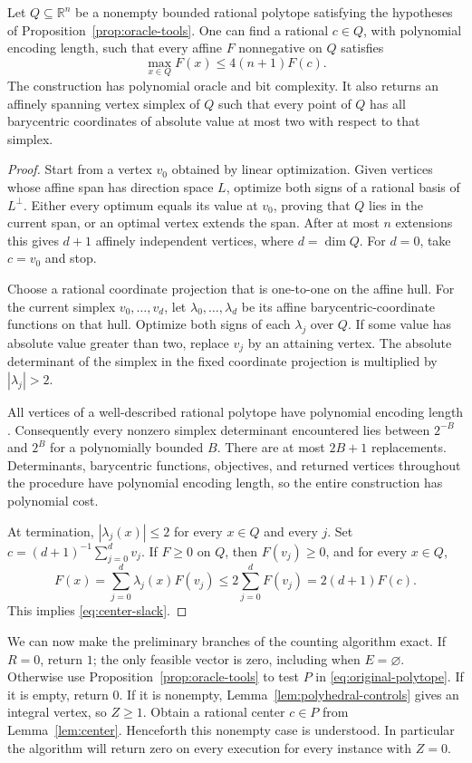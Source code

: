 \begin{lemma}\label{lem:center}
Let $Q\subseteq\mathbb R^n$ be a nonempty bounded rational polytope
satisfying the hypotheses of Proposition~\ref{prop:oracle-tools}.
One can find a rational $c\in Q$, with polynomial encoding length,
such that every affine $F$ nonnegative on $Q$ satisfies
\begin{equation}\label{eq:center-slack}
 \max_{x\in Q}F(x)\leq4(n+1)F(c).
\end{equation}
The construction has polynomial oracle and bit complexity.
It also returns an affinely spanning vertex simplex of $Q$ such that
every point of $Q$ has all barycentric coordinates of absolute value
at most two with respect to that simplex.
\end{lemma}

\begin{proof}
Start from a vertex $v_0$ obtained by linear optimization.
Given vertices whose affine span has direction space $L$, optimize
both signs of a rational basis of $L^\perp$.  Either every optimum
equals its value at $v_0$, proving that $Q$ lies in the current span,
or an optimal vertex extends the span.  After at most $n$ extensions
this gives $d+1$ affinely independent vertices, where $d=\dim Q$.
For $d=0$, take $c=v_0$ and stop.

Choose a rational coordinate projection that is one-to-one on the
affine hull.  For the current simplex $v_0,\ldots,v_d$, let
$\lambda_0,\ldots,\lambda_d$ be its affine barycentric-coordinate
functions on that hull.  Optimize both signs of each $\lambda_j$
over $Q$.  If some value has absolute value greater than two, replace
$v_j$ by an attaining vertex.  The absolute determinant of the
simplex in the fixed coordinate projection is multiplied by
$|\lambda_j|>2$.

All vertices of a well-described rational polytope have polynomial
encoding length \cite[Lemma 6.2.4]{GLS1988}.  Consequently every
nonzero simplex determinant encountered lies between
$2^{-B}$ and $2^B$ for a polynomially bounded $B$.  There are at most
$2B+1$ replacements.  Determinants, barycentric functions, objectives,
and returned vertices throughout the procedure have polynomial
encoding length, so the entire construction has polynomial cost.

At termination, $|\lambda_j(x)|\leq2$ for every $x\in Q$ and every
$j$.  Set $c=(d+1)^{-1}\sum_{j=0}^d v_j$.  If $F\geq0$ on $Q$,
then $F(v_j)\geq0$, and for every $x\in Q$,
\[
 F(x)=\sum_{j=0}^d\lambda_j(x)F(v_j)
 \leq2\sum_{j=0}^dF(v_j)=2(d+1)F(c).
\]
This implies \eqref{eq:center-slack}.
\end{proof}

We can now make the preliminary branches of the counting algorithm
exact.  If $R=0$, return $1$; the only feasible vector is zero,
including when $E=\varnothing$.  Otherwise use
Proposition~\ref{prop:oracle-tools} to test $P$ in
\eqref{eq:original-polytope}.  If it is empty, return $0$.
If it is nonempty, Lemma~\ref{lem:polyhedral-controls} gives an
integral vertex, so $Z\geq1$.  Obtain a rational center $c\in P$
from Lemma~\ref{lem:center}.  Henceforth this nonempty case is
understood.  In particular the algorithm will return zero on every
execution for every instance with $Z=0$.
